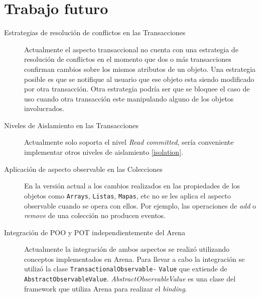 \section{Trabajo futuro}
\label{Futurework}

\begin{description}

	\item[Estrategias de resolución de conflictos en las Transacciones]
		Actualmente el aspecto transaccional no cuenta con una estrategia de
		resolución de conflictos en	el momento que dos o más transacciones
		confirman cambios sobre los mismos atributos de un objeto.
		Una estrategia posible es que se notifique al usuario que ese
		objeto esta siendo modificado por otra transacción.
		Otra estrategia podría ser que se bloquee el caso de uso cuando otra
		transacción este manipulando alguno de los objetos involucrados.
		
	\item[Niveles de Aislamiento en las Transacciones]
		Actualmente solo soporta el nivel \emph{Read committed}, sería conveniente
		implementar otros niveles de aislamiento \ref{isolation}.
	 
	\item[Aplicación de aspecto observable en las Colecciones]
		En la versión actual a los cambios realizados en las propiedades de los objetos
		como \lstinline|Arrays|, \lstinline|Listas|, \lstinline|Mapas|, etc no se les
		aplica el aspecto observable cuando se opera con ellos. Por ejemplo, las
		operaciones de \emph{add} o \emph{remove} de una colección no producen
		eventos.

	\item[Integración de POO y POT independientemente del Arena]
		Actualmente la integración de ambos aspectos se realizó utilizando conceptos
		implementados en Arena. Para llevar a cabo la integración se utilizó la clase
		\lstinline|TransactionalObservable|\lstinline|-| \lstinline|Value| que extiende de
		\lstinline|AbstractObservableValue|. \emph{AbstractObservableValue} es una
		clase del framework que utiliza Arena para realizar el \emph{binding}.
\end{description}